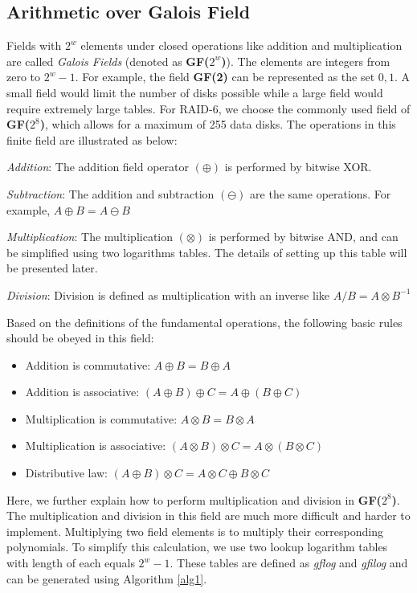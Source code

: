\documentclass[journal]{IEEEtran}
\begin{document}
\subsection{Arithmetic over Galois Field}
Fields with $2^w$ elements under closed operations like addition and multiplication are called \emph{Galois Fields} (denoted as \textbf{GF($2^w$)}). The elements are integers from zero to $2^w-1$. For example, the field \textbf{GF(2)} can be represented as the set ${0,1}$. A small field would limit the number of disks possible while a large field would require extremely large tables. For RAID-6, we choose the commonly used field of \textbf{GF($2^8$)}, which allows for a maximum of 255 data disks. The operations in this finite field are illustrated as below:

\emph{Addition}: The addition field operator $(\oplus)$ is  performed by bitwise XOR. 

\emph{Subtraction}: The addition and subtraction $(\ominus)$ are the same operations. For example, $A \oplus B = A \ominus B$

\emph{Multiplication}: The multiplication $(\otimes)$ is performed by bitwise AND, and can be simplified using two logarithms tables. The details of setting up this table will be presented later.

\emph{Division}: Division is defined as multiplication with an inverse like $A/B = A \otimes B^{-1}$

Based on the definitions of the fundamental operations, the following basic rules should be obeyed in this field:

\begin{itemize}
	\item Addition is commutative: $A \oplus B = B \oplus A$
	\item Addition is associative:    $(A \oplus B) \oplus C = A \oplus (B \oplus C) $
	\item Multiplication is commutative: $A \otimes B = B \otimes A$
	\item Multiplication is associative: $(A \otimes B) \otimes C = A \otimes (B \otimes C)$
	\item  Distributive law: $(A \oplus B) \otimes C = A \otimes C  \oplus B \otimes C$
\end{itemize}

Here, we further explain how to perform multiplication and division in \textbf{GF($2^8$)}. The multiplication and division in this field are much more difficult and harder to implement. Multiplying two field elements is to multiply their corresponding polynomials. To simplify this calculation, we use two lookup logarithm tables with length of each equals $2^w-1$. These tables are defined as \emph{gflog} and \emph{gfilog} and can be generated using Algorithm \ref{alg1}.
\end{document}

